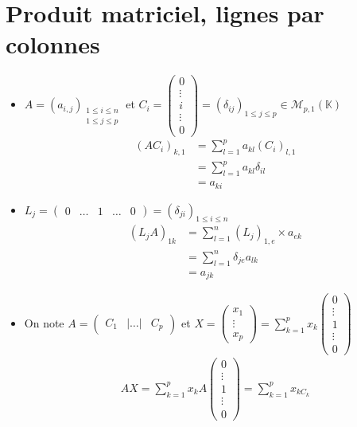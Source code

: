 \documentclass[../main.tex]{subfiles}
\begin{document}
\section{Produit matriciel, lignes par colonnes}
\begin{itemize}
    \item $A = (a_{i,j})_{\substack{1 \leq i \leq n \\ 1 \leq j \leq p}}$ et $C_{i} = \begin{pmatrix} 0 \\ \vdots \\ i \\ \vdots \\ 0 \end{pmatrix} = (\delta_{ij})_{1 \leq j \leq p} \in \mathcal M_{p, 1} (\mathbb K)$
    \begin{align*} 
        (AC_{i})_{k,1} &= \sum^p_{l=1} a_{kl} (C_{i})_{l,1} \\ &= \sum^p_{l=1} a_{kl}\delta_{il} \\ &= a_{ki} 
    \end{align*}
    \item $L_{j} = \begin{pmatrix} 0 & \ldots & 1 & \ldots & 0 \end{pmatrix} = (\delta_{ji})_{1 \leq i \leq n}$
    \begin{align*} 
        (L_{j}A)_{1k} &= \sum^n_{l=1}(L_{j})_{1,e} \times a_{ek} \\ &= \sum^n_{l=1} \delta_{je}a_{lk} \\ &= a_{jk} 
    \end{align*}
    \item On note $A = \begin{pmatrix} C_1 & | \ldots| & C_{p} \end{pmatrix}$ et $X = \begin{pmatrix} x_{1} \\ \vdots \\x_{p} \end{pmatrix} = \sum^p_{k=1} x_{k} \begin{pmatrix} 0 \\ \vdots \\ 1 \\ \vdots \\ 0 \end{pmatrix}$
    \begin{align*} 
        AX = \sum^p_{k=1} x_{k} A \begin{pmatrix} 0 \\ \vdots \\ 1 \\ \vdots \\ 0 \end{pmatrix} = \sum^p_{k=1} x_{kC_{k}} 
    \end{align*}
\end{itemize}
\end{document}
